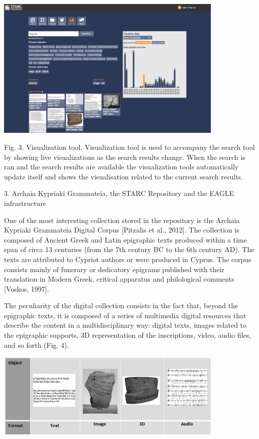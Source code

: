 \documentclass[amsthm,ebook]{saparticle}
\begin{document}
\bigskip

 \includegraphics[width=10.896cm,height=6.81cm]{DamnjanovicetalEAGLE2016-img003.png} 

Fig. 3. Visualization tool. Visualization tool is used to accompany the search tool by showing live visualizations as
the search results change. When the search is ran and the search results are available the visualization tools
automatically update itself and shows the visualisation related to the current search results. 


\bigskip


\bigskip

3. Archaia Kypriaki Grammateia, the STARC Repository and the EAGLE infrastructure

One of the most interesting collection stored in the repository is the Archaia Kypriaki Grammateia Digital Corpus
[Pitzalis et al., 2012]. The collection is composed of Ancient Greek and Latin epigraphic texts produced within a time
span of circa 13 centuries (from the 7th century BC to the 6th century AD). The texts are attributed to Cypriot authors
or were produced in Cyprus. The corpus consists mainly of funerary or dedicatory epigrams published with their
translation in Modern Greek, critical apparatus and philological comments [Voskos, 1997]. 

The peculiarity of the digital collection consists in the fact that, beyond the epigraphic texts, it is composed of a
series of multimedia digital resources that describe the content in a multidisciplinary way: digital texts, images
related to the epigraphic supports, 3D representation of the inscriptions, video, audio files, and so forth (Fig. 4).


\bigskip

 \includegraphics[width=10.938cm,height=4.129cm]{DamnjanovicetalEAGLE2016-img004.jpg} 
\end{document}
